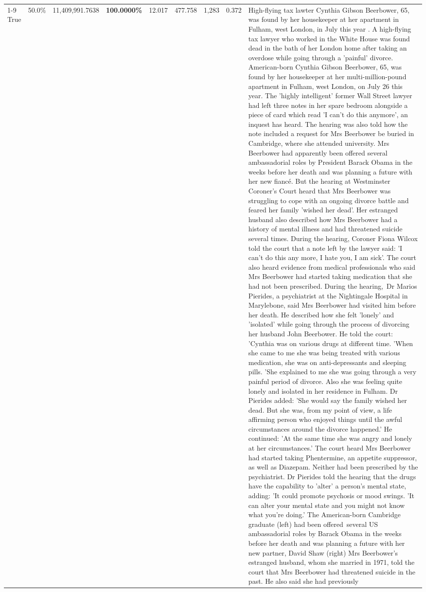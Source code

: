 \begin{table}[H]
\begin{tabular}{lllrlllll}
\cline{1-9}
True & 50.0\% & 11,409,991.7638 & \bfseries \color{red} 100.0000\% & 12.017 & 477.758 & 1,283 & 0.372 & High-flying tax lawter Cynthia Gibson Beerbower, 65, was found by her housekeeper at her apartment in Fulham, west London, in July this year . A high-flying tax lawyer who worked in the White House was found dead in the bath of her London home after taking an overdose while going through a 'painful' divorce. American-born Cynthia Gibson Beerbower, 65, was found by her housekeeper at her multi-million-pound apartment in Fulham, west London, on July 26 this year. The 'highly intelligent' former Wall Street lawyer had left three notes in her spare bedroom alongside a piece of card which read 'I can't do this anymore', an inquest has heard. The hearing was also told how the note included a request for Mrs Beerbower be buried in Cambridge, where she attended university. Mrs Beerbower had apparently been offered several ambassadorial roles by President Barack Obama in the weeks before her death and was planning a future with her new fiancé. But the hearing at Westminster Coroner's Court heard that Mrs Beerbower was struggling to cope with an ongoing divorce battle and feared her family 'wished her dead'. Her estranged husband also described how Mrs Beerbower had a history of mental illness and had threatened suicide several times. During the hearing, Coroner Fiona Wilcox told the court that a note left by the lawyer said: 'I can't do this any more, I hate you, I am sick'. The court also heard evidence from medical professionals who said Mrs Beerbower had started taking medication that she had not been prescribed. During the hearing, Dr Marios Pierides, a psychiatrist at the Nightingale Hospital in Marylebone, said Mrs Beerbower had visited him before her death. He described how she felt 'lonely' and 'isolated' while going through the process of divorcing her husband John Beerbower. He told the court: 'Cynthia was on various drugs at different time. 'When she came to me she was being treated with various medication, she was on anti-depressants and sleeping pills. 'She explained to me she was going through a very painful period of divorce. Also she was feeling quite lonely and isolated in her residence in Fulham. Dr Pierides added: 'She would say the family wished her dead. But she was, from my point of view, a life affirming person who enjoyed things until the awful circumstances around the divorce happened.' He continued: 'At the same time she was angry and lonely at her circumstances.' The court heard Mrs Beerbower had started taking Phentermine, an appetite suppressor, as well as Diazepam. Neither had been prescribed by the psychiatrist. Dr Pierides told the hearing that the drugs have the capability to 'alter' a person's mental state, adding: 'It could promote psychosis or mood swings. 'It can alter your mental state and you might not know what you're doing.' The American-born Cambridge graduate (left) had been offered several US ambassadorial roles by Barack Obama in the weeks before her death and was planning a future with her new partner, David Shaw (right) Mrs Beerbower's estranged husband, whom she married in 1971, told the court that Mrs Beerbower had threatened suicide in the past. He also said she had previously 
\end{tabular}
\end{table}
